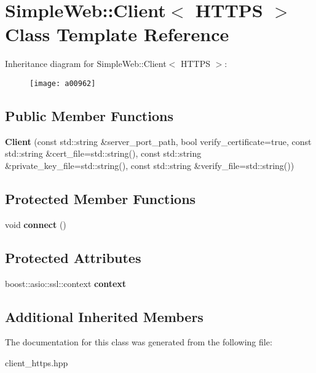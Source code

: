 \hypertarget{a00962}{}\section{Simple\+Web\+:\+:Client$<$ H\+T\+T\+PS $>$ Class Template Reference}
\label{a00962}
Inheritance diagram for Simple\+Web\+:\+:Client$<$ H\+T\+T\+PS $>$\+:\begin{figure}[H]
\begin{center}
\leavevmode
\texttt{[image: a00962]}
\end{center}
\end{figure}
\subsection*{Public Member Functions}
\begin{DoxyCompactItemize}
\item 
\mbox{\label{a00962_abd87d3dc08c9fed3a60f18c749b8bacd}} 
{\bfseries Client} (const std\+::string \&server\+\_\+port\+\_\+path, bool verify\+\_\+certificate=true, const std\+::string \&cert\+\_\+file=std\+::string(), const std\+::string \&private\+\_\+key\+\_\+file=std\+::string(), const std\+::string \&verify\+\_\+file=std\+::string())
\end{DoxyCompactItemize}
\subsection*{Protected Member Functions}
\begin{DoxyCompactItemize}
\item 
\mbox{\label{a00962_a833f6fd136e3158b873bee024d6e188c}} 
void {\bfseries connect} ()
\end{DoxyCompactItemize}
\subsection*{Protected Attributes}
\begin{DoxyCompactItemize}
\item 
\mbox{\label{a00962_afe57679cc6153d5d1fe8abc94a8fa58a}} 
boost\+::asio\+::ssl\+::context {\bfseries context}
\end{DoxyCompactItemize}
\subsection*{Additional Inherited Members}


The documentation for this class was generated from the following file\+:\begin{DoxyCompactItemize}
\item 
client\+\_\+https.\+hpp\end{DoxyCompactItemize}
